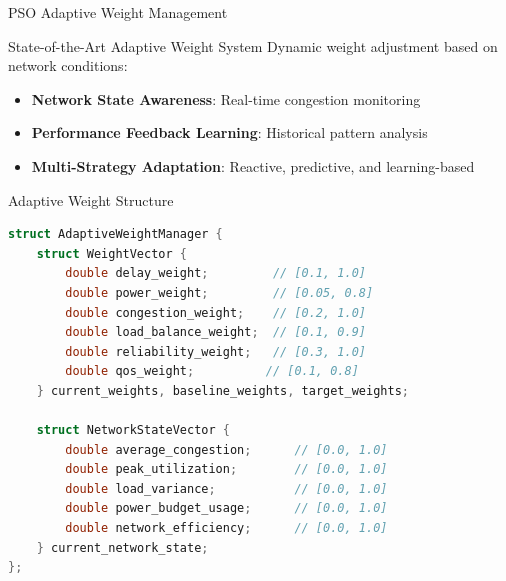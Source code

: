 \documentclass[10pt,aspectratio=169]{beamer}
\begin{document}
\begin{frame}[fragile]{PSO Adaptive Weight Management}
    \begin{block}{State-of-the-Art Adaptive Weight System}
        Dynamic weight adjustment based on network conditions:
        \begin{itemize}
            \item \textbf{Network State Awareness}: Real-time congestion monitoring
            \item \textbf{Performance Feedback Learning}: Historical pattern analysis
            \item \textbf{Multi-Strategy Adaptation}: Reactive, predictive, and learning-based
        \end{itemize}
    \end{block}
    
    \begin{block}{Adaptive Weight Structure}
        \begin{lstlisting}[language=C++, basicstyle=\tiny\ttfamily]
struct AdaptiveWeightManager {
    struct WeightVector {
        double delay_weight;         // [0.1, 1.0]
        double power_weight;         // [0.05, 0.8]
        double congestion_weight;    // [0.2, 1.0]
        double load_balance_weight;  // [0.1, 0.9]
        double reliability_weight;   // [0.3, 1.0]
        double qos_weight;          // [0.1, 0.8]
    } current_weights, baseline_weights, target_weights;
    
    struct NetworkStateVector {
        double average_congestion;      // [0.0, 1.0]
        double peak_utilization;        // [0.0, 1.0]
        double load_variance;           // [0.0, 1.0]
        double power_budget_usage;      // [0.0, 1.0]
        double network_efficiency;      // [0.0, 1.0]
    } current_network_state;
};
        \end{lstlisting}
    \end{block}
\end{frame}
\end{document}

